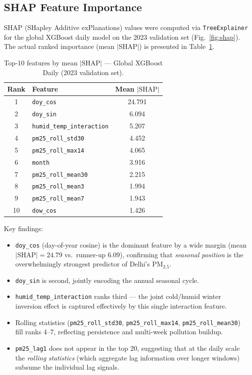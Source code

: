 \documentclass[11pt,a4paper]{article}
\begin{document}
\subsection{SHAP Feature Importance}
SHAP (SHapley Additive exPlanations) values were computed via \texttt{TreeExplainer} for the global XGBoost daily model on the 2023 validation set (Fig.~\ref{fig:shap}). The actual ranked importance (mean $|$SHAP$|$) is presented in Table~\ref{tab:shap_top10}.

\begin{table}[H]
    \centering
    \caption{Top-10 features by mean $|\text{SHAP}|$ --- Global XGBoost Daily (2023 validation set).}
    \label{tab:shap_top10}
    \begin{tabular}{clc}
        \toprule
        \textbf{Rank} & \textbf{Feature} & \textbf{Mean $|\text{SHAP}|$} \\
        \midrule
        1  & \texttt{doy\_cos}               & 24.791 \\
        2  & \texttt{doy\_sin}               & 6.094  \\
        3  & \texttt{humid\_temp\_interaction}& 5.207  \\
        4  & \texttt{pm25\_roll\_std30}       & 4.452  \\
        5  & \texttt{pm25\_roll\_max14}       & 4.065  \\
        6  & \texttt{month}                  & 3.916  \\
        7  & \texttt{pm25\_roll\_mean30}      & 2.215  \\
        8  & \texttt{pm25\_roll\_mean3}       & 1.994  \\
        9  & \texttt{pm25\_roll\_mean7}       & 1.943  \\
        10 & \texttt{dow\_cos}               & 1.426  \\
        \bottomrule
    \end{tabular}
\end{table}

Key findings:
\begin{itemize}
    \item \texttt{doy\_cos} (day-of-year cosine) is the dominant feature by a wide margin (mean $|\text{SHAP}|=24.79$ vs.\ runner-up $6.09$), confirming that \emph{seasonal position} is the overwhelmingly strongest predictor of Delhi's PM$_{2.5}$.
    \item \texttt{doy\_sin} is second, jointly encoding the annual seasonal cycle.
    \item \texttt{humid\_temp\_interaction} ranks third --- the joint cold/humid winter inversion effect is captured effectively by this single interaction feature.
    \item Rolling statistics (\texttt{pm25\_roll\_std30}, \texttt{pm25\_roll\_max14}, \texttt{pm25\_roll\_mean30}) fill ranks 4--7, reflecting persistence and multi-week pollution buildup.
    \item \texttt{pm25\_lag1} does not appear in the top 20, suggesting that at the daily scale the \emph{rolling statistics} (which aggregate lag information over longer windows) subsume the individual lag signals.
\end{itemize}
\end{document}
